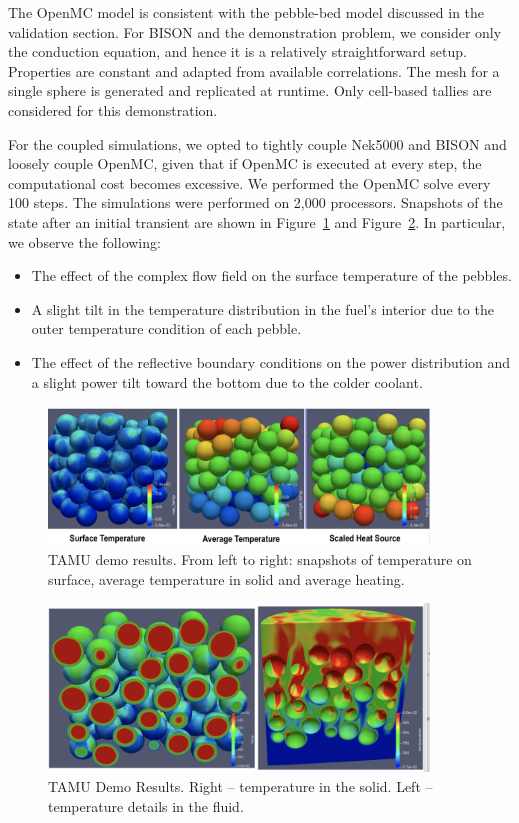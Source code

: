 The OpenMC model is consistent with the pebble-bed model discussed in the validation section. For BISON and the demonstration problem, we consider only the conduction equation, and hence it is a relatively straightforward setup. Properties are constant and adapted from available correlations. The mesh for a single sphere is generated and replicated at runtime. Only cell-based tallies are considered for this demonstration.

For the coupled simulations, we opted to tightly couple Nek5000 and BISON and loosely couple OpenMC, given that if OpenMC is executed at every step, the computational cost becomes excessive. We performed the OpenMC solve every 100 steps. The simulations were performed on 2,000 processors. Snapshots of the state after an initial transient are shown in Figure~\ref{f:dtamu1} and Figure~\ref{f:dtamu2}. In particular, we observe the following:
\begin{itemize}
  \item The effect of the complex flow field on the surface temperature of the pebbles.
  \item A slight tilt in the temperature distribution in the fuel's interior due to the outer temperature condition of each pebble.
  \item The effect of the reflective boundary conditions on the power distribution and a slight power tilt toward the bottom due to the colder coolant.
\end{itemize}

\begin{figure}[!h]
\centering
\includegraphics[clip=true,width=0.9\textwidth]{Figures/demo_r1}
\caption{TAMU demo results. From left to right: snapshots of temperature on surface, average temperature in solid and average heating.}
\label{f:dtamu1}
\end{figure}

\begin{figure}[!h]
\centering
\includegraphics[clip=true,width=0.9\textwidth]{Figures/demo_r2}
\caption{TAMU Demo Results. Right -- temperature in the solid. Left -- temperature details in the fluid.}
\label{f:dtamu2}
\end{figure}

